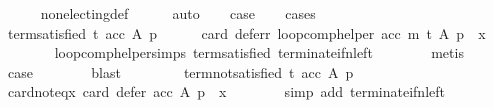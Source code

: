 \begin{isabellebody}
\ \ \ \ \isamarkupfalse%
\ non{\isacharunderscore}{\kern0pt}electing{\isacharunderscore}{\kern0pt}def\isanewline
\ \ \ \ \isamarkupfalse%
\ auto\isanewline
\ \ \isamarkupfalse%
\ {\isacharquery}{\kern0pt}case\isanewline
\ \ \isamarkupfalse%
\ cases\isanewline
\ \ \ \ \isamarkupfalse%
\ term{\isacharunderscore}{\kern0pt}satisfied{\isacharcolon}{\kern0pt}\ {\isachardoublequoteopen}t\ {\isacharparenleft}{\kern0pt}acc\ A\ p{\isacharparenright}{\kern0pt}{\isachardoublequoteclose}\isanewline
\ \ \ \ \isamarkupfalse%
\ {\isachardoublequoteopen}card\ {\isacharparenleft}{\kern0pt}defer{\isacharunderscore}{\kern0pt}r\ {\isacharparenleft}{\kern0pt}loop{\isacharunderscore}{\kern0pt}comp{\isacharunderscore}{\kern0pt}helper\ acc\ m\ t\ A\ p{\isacharparenright}{\kern0pt}{\isacharparenright}{\kern0pt}\ {\isacharequal}{\kern0pt}\ x{\isachardoublequoteclose}\isanewline
\ \ \ \ \ \ \isamarkupfalse%
\ loop{\isacharunderscore}{\kern0pt}comp{\isacharunderscore}{\kern0pt}helper{\isachardot}{\kern0pt}simps{\isacharparenleft}{\kern0pt}{}{\isacharparenright}{\kern0pt}\ term{\isacharunderscore}{\kern0pt}satisfied\ terminate{\isacharunderscore}{\kern0pt}if{\isacharunderscore}{\kern0pt}n{\isacharunderscore}{\kern0pt}left\isanewline
\ \ \ \ \ \ \isamarkupfalse%
\ metis\isanewline
\ \ \ \ \isamarkupfalse%
\ {\isacharquery}{\kern0pt}case\isanewline
\ \ \ \ \ \ \isamarkupfalse%
\ blast\isanewline
\ \ \isamarkupfalse%
\isanewline
\ \ \ \ \isamarkupfalse%
\ term{\isacharunderscore}{\kern0pt}not{\isacharunderscore}{\kern0pt}satisfied{\isacharcolon}{\kern0pt}\ {\isachardoublequoteopen}{\isasymnot}{\isacharparenleft}{\kern0pt}t\ {\isacharparenleft}{\kern0pt}acc\ A\ p{\isacharparenright}{\kern0pt}{\isacharparenright}{\kern0pt}{\isachardoublequoteclose}\isanewline
\ \ \ \ \isamarkupfalse%
\ card{\isacharunderscore}{\kern0pt}not{\isacharunderscore}{\kern0pt}eq{\isacharunderscore}{\kern0pt}x{\isacharcolon}{\kern0pt}\ {\isachardoublequoteopen}card\ {\isacharparenleft}{\kern0pt}defer\ acc\ A\ p{\isacharparenright}{\kern0pt}\ {\isasymnoteq}\ x{\isachardoublequoteclose}\isanewline
\ \ \ \ \ \ \isamarkupfalse%
\ {\isacharparenleft}{\kern0pt}simp\ add{\isacharcolon}{\kern0pt}\ terminate{\isacharunderscore}{\kern0pt}if{\isacharunderscore}{\kern0pt}n{\isacharunderscore}{\kern0pt}left{\isacharparenright}{\kern0pt}\isanewline
\ \ \ \ \isamarkupfalse%

\end{isabellebody}
